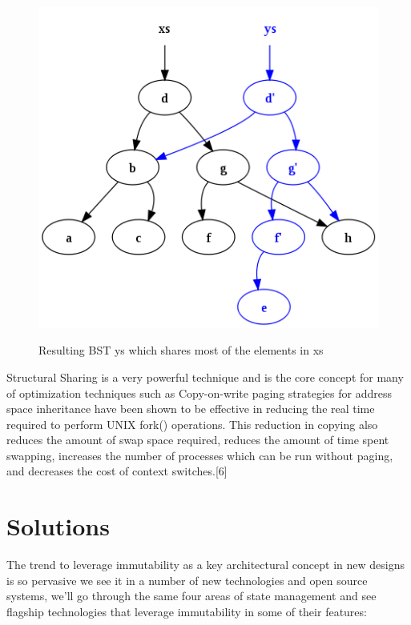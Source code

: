 \documentclass[12pt,twoside]{article}
\begin{document}
\begin{figure}[H]
    \begin{center}
        {\includegraphics[scale=.6]{structuralSharing.png}}
       \end{center}
       \caption{ \label{figure:2} Resulting BST ys which shares most of the elements in xs}
\end{figure}
Structural Sharing is a very powerful technique and is the core concept for many of optimization techniques such as Copy-on-write paging strategies for address space
inheritance have been shown to be effective in reducing the
real time required to perform UNIX fork() operations. This reduction in copying also reduces the amount of
swap space required, reduces the amount of time spent swapping, increases the number of processes which can be run
without paging, and decreases the cost of context switches.[6]


\section{Solutions}


The trend to leverage immutability as a key architectural concept in new designs is so pervasive we see it in a number of new technologies and open source systems, we'll go through the same four areas of state management and see flagship technologies that leverage immutability in some of their features:
\end{document}
